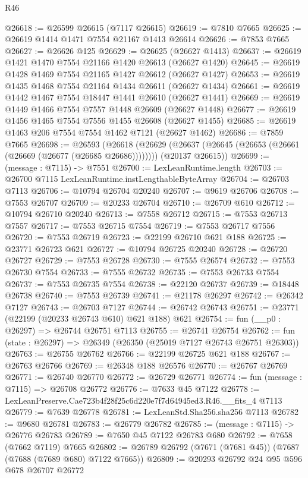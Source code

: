 \begin{lexlean}{R46}
\begin{coremodule}
@26618 := @26599 @26615 (@7117 @26615)
@26619 := @7810 @7665
@26625 := @26619 @1414 @1471 @7554 @21167 @1413 @26614
@26626 := @7853 @7665
@26627 := @26626 @125
@26629 := @26625 (@26627 @1413)
@26637 := @26619 @1421 @1470 @7554 @21166 @1420 @26613 (@26627 @1420)
@26645 := @26619 @1428 @1469 @7554 @21165 @1427 @26612 (@26627 @1427)
@26653 := @26619 @1435 @1468 @7554 @21164 @1434 @26611 (@26627 @1434)
@26661 := @26619 @1442 @1467 @7554 @18447 @1441 @26610 (@26627 @1441)
@26669 := @26619 @1449 @1466 @7554 @7557 @1448 @26609 (@26627 @1448)
@26677 := @26619 @1456 @1465 @7554 @7556 @1455 @26608 (@26627 @1455)
@26685 := @26619 @1463 @206 @7554 @7554 @1462 @7121 (@26627 @1462)
@26686 := @7859 @7665
@26698 := @26593
    (@26618
      (@26629 (@26637 (@26645 (@26653 (@26661 (@26669 (@26677 (@26685 @26686))))))))
      (@20137 @26615))
@26699 := (message : @7115) -> @7551
@26700 := LexLeanRuntime.length
@26703 := @26700 @7115 LexLeanRuntime.instLengthableByteArray
@26704 := @26703 @7113
@26706 := @10794 @26704 @20240
@26707 := @9619 @26706
@26708 := @7553 @26707
@26709 := @20233 @26704
@26710 := @26709 @610
@26712 := @10794 @26710 @20240
@26713 := @7558 @26712
@26715 := @7553 @26713 @7557
@26717 := @7553 @26715 @7554
@26719 := @7553 @26717 @7556
@26720 := @7553 @26719
@26723 := @22199 @26710 @621 @188
@26725 := @23771 @26723 @621
@26727 := @10794 @26725 @20240
@26728 := @26720 @26727
@26729 := @7553 @26728
@26730 := @7555 @26574
@26732 := @7553 @26730 @7554
@26733 := @7555 @26732
@26735 := @7553 @26733 @7554
@26737 := @7553 @26735 @7554
@26738 := @22120 @26737
@26739 := @18448 @26738
@26740 := @7553 @26739
@26741 := @21178 @26297
@26742 := @26342 @7127
@26743 := @26703 @7127
@26744 := @26742 @26743
@26751 := @23771 (@22199 (@20233 @26743 @610) @621 @188) @621
@26754 := fun (__p0 : @26297) => @26744 @26751 @7113
@26755 := @26741 @26754
@26762 := fun (state : @26297) => @26349 (@26350 (@25019 @7127 @26743 @26751 @26303))
@26763 := @26755 @26762
@26766 := @22199 @26725 @621 @188
@26767 := @26763 @26766
@26769 := @26348 @188 @26576
@26770 := @26767 @26769
@26771 := @26740 @26770
@26772 := @26729 @26771
@26774 := fun (message : @7115) => @26708 @26772
@26776 := @7633 @45 @7122
@26778 := LexLeanPreserve.Cae723b4f28f25c6d220e7f7d64945ed3.R46.__fits_4 @7113
@26779 := @7639 @26778
@26781 := LexLeanStd.Sha256.sha256 @7113
@26782 := @9680 @26781
@26783 := @26779 @26782
@26785 := (message : @7115) -> @26776 @26783
@26789 := @7650 @45 @7122 @26783 @680
@26792 := @7658 (@7662 @7119) @7665
@26802 := @26789 @26792 (@7671 (@7681 @45)) (@7687 (@7688 (@7689 @680) @7122 @7665))
@26809 := @20293 @26792 @24 @95 @596 @678 @26707 @26772

\end{coremodule}
\end{lexlean}
